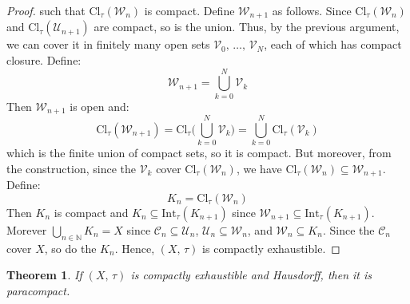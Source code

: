 \documentclass{article}
\theoremstyle{plain}
\newtheorem{theorem}{Theorem}[section]
\theoremstyle{normal}
\begin{document}
\begin{proof}
            such that $\textrm{Cl}_{\tau}(\mathcal{W}_{n})$ is compact.
            Define $\mathcal{W}_{n+1}$ as follows. Since
            $\textrm{Cl}_{\tau}(\mathcal{W}_{n})$ and
            $\textrm{Cl}_{\tau}(\mathcal{U}_{n+1})$ are compact, so is the
            union. Thus, by the previous argument, we can cover it in finitely
            many open sets $\mathcal{V}_{0},\,\dots,\,\mathcal{V}_{N}$, each
            of which has compact closure. Define:
            \begin{equation}
                \mathcal{W}_{n+1}=\bigcup_{k=0}^{N}\mathcal{V}_{k}
            \end{equation}
            Then $\mathcal{W}_{n+1}$ is open and:
            \begin{equation}
                \textrm{Cl}_{\tau}(\mathcal{W}_{n+1})
                =\textrm{Cl}_{\tau}\Big(\bigcup_{k=0}^{N}\mathcal{V}_{k}\Big)
                =\bigcup_{k=0}^{N}\textrm{Cl}_{\tau}(\mathcal{V}_{k})
            \end{equation}
            which is the finite union of compact sets, so it is compact.
            But moreover, from the construction, since the $\mathcal{V}_{k}$
            cover $\textrm{Cl}_{\tau}(\mathcal{W}_{n})$, we have
            $\textrm{Cl}_{\tau}(\mathcal{W}_{n})\subseteq\mathcal{W}_{n+1}$.
            Define:
            \begin{equation}
                K_{n}=\textrm{Cl}_{\tau}(\mathcal{W}_{n})
            \end{equation}
            Then $K_{n}$ is compact and
            $K_{n}\subseteq\textrm{Int}_{\tau}(K_{n+1})$ since
            $\mathcal{W}_{n+1}\subseteq\textrm{Int}_{\tau}(K_{n+1})$. Morever
            $\bigcup_{n\in\mathbb{N}}K_{n}=X$ since
            $\mathcal{C}_{n}\subseteq\mathcal{U}_{n}$,
            $\mathcal{U}_{n}\subseteq\mathcal{W}_{n}$, and
            $\mathcal{W}_{n}\subseteq{K}_{n}$. Since the $\mathcal{C}_{n}$
            cover $X$, so do the $K_{n}$. Hence, $(X,\,\tau)$ is
            compactly exhaustible.
        \end{proof}
        \begin{theorem}
            If $(X,\,\tau)$ is compactly exhaustible and Hausdorff,
            then it is paracompact.
        \end{theorem}
\end{document}
